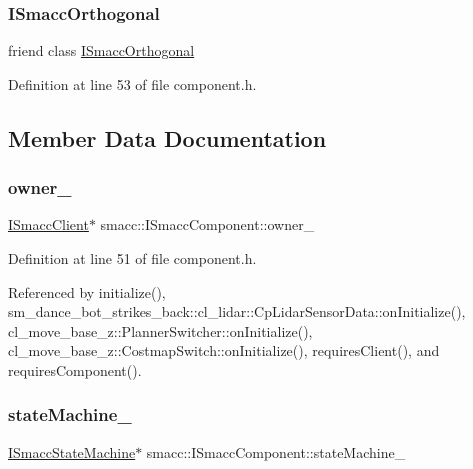 \subsubsection{\texorpdfstring{I\+Smacc\+Orthogonal}{ISmaccOrthogonal}}
{\footnotesize\ttfamily friend class \hyperlink{classsmacc_1_1ISmaccOrthogonal}{I\+Smacc\+Orthogonal}\hspace{0.3cm}{\ttfamily [friend]}}



Definition at line 53 of file component.\+h.



\subsection{Member Data Documentation}
\mbox{\label{classsmacc_1_1ISmaccComponent_a909590e672450ce0eb0d8facb45c737a}} 
\subsubsection{\texorpdfstring{owner\+\_\+}{owner\_}}
{\footnotesize\ttfamily \hyperlink{classsmacc_1_1ISmaccClient}{I\+Smacc\+Client}$\ast$ smacc\+::\+I\+Smacc\+Component\+::owner\+\_\+\hspace{0.3cm}{\ttfamily [protected]}}



Definition at line 51 of file component.\+h.



Referenced by initialize(), sm\+\_\+dance\+\_\+bot\+\_\+strikes\+\_\+back\+::cl\+\_\+lidar\+::\+Cp\+Lidar\+Sensor\+Data\+::on\+Initialize(), cl\+\_\+move\+\_\+base\+\_\+z\+::\+Planner\+Switcher\+::on\+Initialize(), cl\+\_\+move\+\_\+base\+\_\+z\+::\+Costmap\+Switch\+::on\+Initialize(), requires\+Client(), and requires\+Component().

\mbox{\label{classsmacc_1_1ISmaccComponent_ae3f37acc1679f79299b86872d4b1f80f}} 
\subsubsection{\texorpdfstring{state\+Machine\+\_\+}{stateMachine\_}}
{\footnotesize\ttfamily \hyperlink{classsmacc_1_1ISmaccStateMachine}{I\+Smacc\+State\+Machine}$\ast$ smacc\+::\+I\+Smacc\+Component\+::state\+Machine\+\_\+\hspace{0.3cm}{\ttfamily [protected]}}



